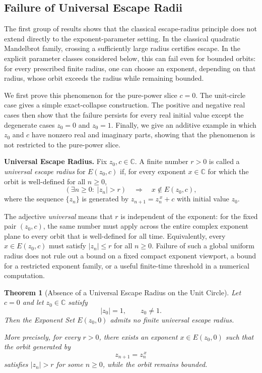 \documentclass[12pt,a4paper]{amsart}
\newtheorem{theorem}{Theorem}[section]
\theoremstyle{remark}
\newcommand{\C}{\mathbb{C}}
\begin{document}
\subsection{Failure of Universal Escape Radii}

The first group of results shows that the classical escape-radius principle
does not extend directly to the exponent-parameter setting. In the classical quadratic Mandelbrot family, crossing a sufficiently large
radius certifies escape. In the explicit parameter classes considered below, this can
fail even for bounded orbits: for every prescribed finite radius, one can
choose an exponent, depending on that radius, whose orbit exceeds the radius
while remaining bounded.

We first prove this phenomenon for the pure-power slice $c=0$. The unit-circle
case gives a simple exact-collapse construction. The positive and negative real
cases then show that the failure persists for every real initial value except
the degenerate cases $z_0=0$ and $z_0=1$. Finally, we give an additive example
in which $z_0$ and $c$ have nonzero real and imaginary parts, showing that the
phenomenon is not restricted to the pure-power slice.

\noindent\textbf{Universal Escape Radius.}
Fix $z_0,c\in\C$. A finite number $r>0$ is called a
\emph{universal escape radius} for $E(z_0,c)$ if, for every exponent
$x\in\C$ for which the orbit is well-defined for all $n\ge 0$,
\[
(\exists n\ge 0:\; |z_n|>r)
\quad\Longrightarrow\quad
x\notin E(z_0,c),
\]
where the sequence $\{z_n\}$ is generated by
$z_{n+1}=z_n^{\,x}+c$ with initial value $z_0$.

The adjective \emph{universal} means that $r$ is independent of the exponent:
for the fixed pair $(z_0,c)$, the same number must apply across the entire
complex exponent plane to every orbit that is well-defined for all time.
Equivalently, every $x\in E(z_0,c)$ must satisfy $|z_n|\le r$ for all
$n\ge0$. Failure of such a global uniform radius does not rule out a bound on
a fixed compact exponent viewport, a bound for a restricted exponent family,
or a useful finite-time threshold in a numerical computation.

\begin{theorem}[Absence of a Universal Escape Radius on the Unit Circle]
\label{thm:no-universal-radius-unit-circle}
Let $c=0$ and let $z_0\in\C$ satisfy
\[
|z_0|=1,
\qquad
z_0\ne 1.
\]
Then the Exponent Set $E(z_0,0)$ admits no finite universal escape radius.

More precisely, for every $r>0$, there exists an exponent $x\in E(z_0,0)$
such that the orbit generated by
\[
z_{n+1}=z_n^{\,x}
\]
satisfies $|z_n|>r$ for some $n\ge 0$, while the orbit remains bounded.
\end{theorem}
\end{document}
